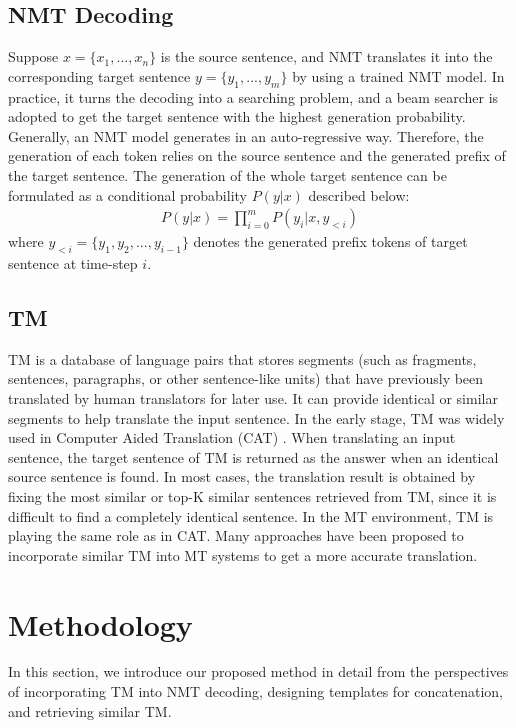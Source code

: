 \documentclass[letterpaper]{article} %
\begin{document}
\subsection{NMT Decoding}
Suppose $x=\{x_1, ...,x_n\}$ is the source sentence, and NMT translates it into the corresponding target sentence $y=\{y_1, ...,y_m\}$ by using a trained NMT model. In practice, it turns the decoding into a searching problem, and a beam searcher is adopted to get the target sentence with the highest generation probability. Generally, an NMT model generates in an auto-regressive way. Therefore, the generation of each token relies on the source sentence and the generated prefix of the target sentence. The generation of the whole target sentence can be formulated as a conditional probability $P(y|x)$ described below:
\begin{eqnarray}
P(y|x)=\prod_{i=0}^{m}P(y_i|x,y_{<i}) \label{eq 1}
\end{eqnarray}
where $y_{<i}=\{y_1,y_2,...,y_{i-1}\}$ denotes the generated prefix tokens of target sentence at time-step $i$.


\subsection{TM}
TM is a database of language pairs that stores segments (such as fragments, sentences, paragraphs, or other sentence-like units) that have previously been translated by human translators for later use. It can provide identical or similar segments to help translate the input sentence. In the early stage, TM was widely used in Computer Aided Translation (CAT) \cite{Sarah2006Translators}. When translating an input sentence, the target sentence of TM is returned as the answer when an identical source sentence is found. In most cases, the translation result is obtained by fixing the most similar or top-K similar sentences retrieved from TM, since it is difficult to find a completely identical sentence. In the MT environment, TM is playing the same role as in CAT. Many approaches have been proposed to incorporate similar TM into MT systems to get a more accurate translation.

\section{Methodology}

In this section, we introduce our proposed method in detail from the perspectives of incorporating TM into NMT decoding, designing templates for concatenation, and retrieving similar TM.
\end{document}
